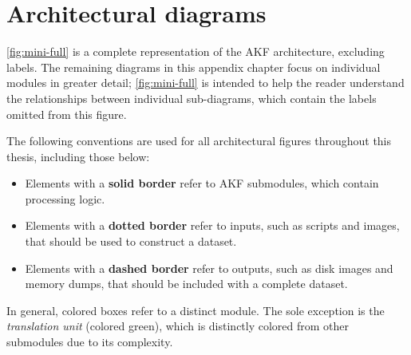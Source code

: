 \documentclass[letterpaper,12pt]{report}
\def\tightlist{}
\begin{document}



\singlespacing
\printbibliography[heading=bibintoc, title={Bibliography}]
% 

\doublespacing
\appendix

\appendix

\chapter{Architectural diagrams}\label{appendix-a}

\autoref{fig:mini-full} is a complete representation of the AKF
architecture, excluding labels. The remaining diagrams in this appendix
chapter focus on individual modules in greater detail;
\autoref{fig:mini-full} is intended to help the reader understand the
relationships between individual sub-diagrams, which contain the labels
omitted from this figure.

The following conventions are used for all architectural figures
throughout this thesis, including those below:

\begin{itemize}
\tightlist
\item
  Elements with a \textbf{solid border} refer to AKF submodules, which
  contain processing logic.
\item
  Elements with a \textbf{dotted border} refer to inputs, such as
  scripts and images, that should be used to construct a dataset.
\item
  Elements with a \textbf{dashed border} refer to outputs, such as disk
  images and memory dumps, that should be included with a complete
  dataset.
\end{itemize}

In general, colored boxes refer to a distinct module. The sole exception
is the \emph{translation unit} (colored green), which is distinctly
colored from other submodules due to its complexity.
\end{document}
